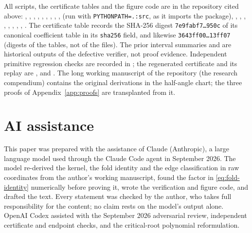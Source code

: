 \documentclass[11pt]{article}
\theoremstyle{remark}
\begin{document}
All scripts, the certificate tables and the figure code are in the
repository cited above: ,
, ,
, ,
, ,
,
,
 (run with
\texttt{PYTHONPATH=.:src}, as it imports the  package),
, ,
, ,
, ,
,
,
.  The certificate table
 records the SHA-256 digest
\texttt{7e9fabf7\ldots950c} of its canonical coefficient table in its
\texttt{sha256} field, and 
likewise \texttt{3643ff00\ldots13ff07} (digests of the tables, not of the
files).  The prior interval summaries
 and 
are historical outputs of the defective verifier, not proof evidence.
Independent primitive regression checks are recorded in
; the regenerated certificate and its
replay are ,
 and
.  The long
working manuscript  of the
repository (the research compendium) contains the original derivations in
the half-angle chart; the three proofs of Appendix~\ref{app:proofs} are
transplanted from it.

\section*{AI assistance}

This paper was prepared with the assistance of Claude (Anthropic), a large
language model used through the Claude Code agent in September 2026.  The
model re-derived the kernel, the fold identity and the edge classification
in raw coordinates from the author's working manuscript, found the factor
in \eqref{eq:fold-identity} numerically before proving it, wrote the
verification and figure code, and drafted the text.  Every statement was
checked by the author, who takes full responsibility for the content; no
claim rests on the model's output alone.  OpenAI Codex assisted with the
September 2026 adversarial review, independent certificate and endpoint
checks, and the critical-root polynomial reformulation.
\end{document}
